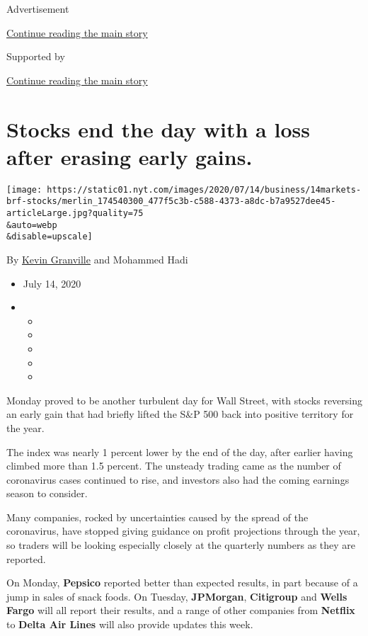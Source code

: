 Advertisement

\protect\hyperlink{after-top}{Continue reading the main story}

Supported by

\protect\hyperlink{after-sponsor}{Continue reading the main story}

\hypertarget{stocks-end-the-day-with-a-loss-after-erasing-early-gains}{%
\section{Stocks end the day with a loss after erasing early
gains.}\label{stocks-end-the-day-with-a-loss-after-erasing-early-gains}}

\texttt{[image: https://static01.nyt.com/images/2020/07/14/business/14markets-brf-stocks/merlin\_174540300\_477f5c3b-c588-4373-a8dc-b7a9527dee45-articleLarge.jpg?quality=75\\\&auto=webp\\\&disable=upscale]}

By \href{https://www.nytimes.com/by/kevin-granville}{Kevin Granville}
and Mohammed Hadi

\begin{itemize}
\item
  July 14, 2020
\item
  \begin{itemize}
  \item
  \item
  \item
  \item
  \item
  \end{itemize}
\end{itemize}

Monday proved to be another turbulent day for Wall Street, with stocks
reversing an early gain that had briefly lifted the S\&P 500 back into
positive territory for the year.

The index was nearly 1 percent lower by the end of the day, after
earlier having climbed more than 1.5 percent. The unsteady trading came
as the number of coronavirus cases continued to rise, and investors also
had the coming earnings season to consider.

Many companies, rocked by uncertainties caused by the spread of the
coronavirus, have stopped giving guidance on profit projections through
the year, so traders will be looking especially closely at the quarterly
numbers as they are reported.

On Monday, \textbf{Pepsico} reported better than expected results, in
part because of a jump in sales of snack foods. On Tuesday,
\textbf{JPMorgan}, \textbf{Citigroup} and \textbf{Wells Fargo} will all
report their results, and a range of other companies from
\textbf{Netflix} to \textbf{Delta Air Lines} will also provide updates
this week.

